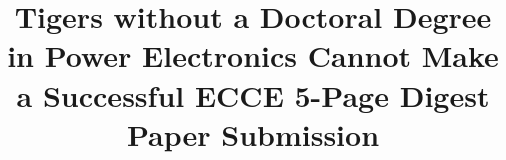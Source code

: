 \documentclass[pdftex,11pt,oneside,letter]{article}
\begin{document}
\title {\large  \bf \vspace{-8ex}
Tigers without a Doctoral Degree in Power Electronics Cannot Make a Successful ECCE 5-Page Digest Paper Submission
\vspace{-10ex}}
\date{}
\maketitle
\thispagestyle{empty}
\pagestyle{empty}

\renewcommand{\figurename}{Fig.}









{\vspace{\baselineskip}


}
\end{document}
